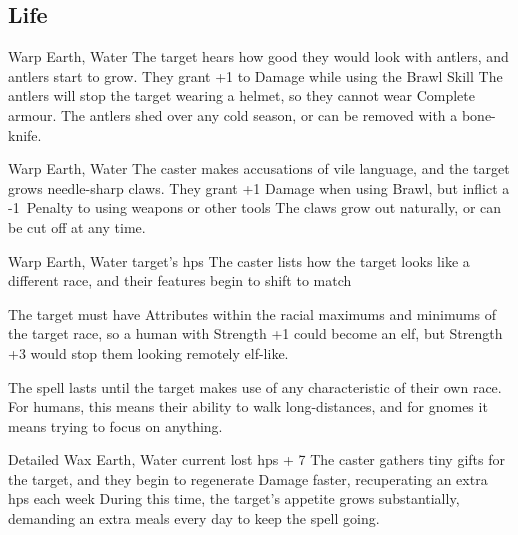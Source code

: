 \begin{multicols}{2}
{  



  \subsection{Life}
  \label{lifeSpells}


    {}%
    {Warp}%
    {Earth, Water}%
    {}%
    {The target hears how good they would look with antlers, and antlers start to grow.
    They grant +1 to Damage while using the Brawl Skill}%
    {
    The antlers will stop the target wearing a helmet, so they cannot wear Complete armour.
    The antlers shed over any cold season, or can be removed with a bone-knife.}

    {}%
    {Warp}%
    {Earth, Water}%
    {}%
    {The caster makes accusations of vile language, and the target grows needle-sharp claws.
    They grant +1 Damage when using Brawl, but inflict a -1~Penalty to using weapons or other tools}%
    {
    The claws grow out naturally, or can be cut off at any time.}

    {}%
    {Warp}%
    {Earth, Water}%
    {target's \glspl{hp}}%
    {The caster lists how the target looks like a different race, and their features begin to shift to match}%
    {The target must have Attributes within the racial maximums and minimums of the target race, so a human with Strength +1 could become an elf, but Strength +3 would stop them looking remotely elf-like.

    The spell lasts until the target makes use of any characteristic of their own race.
    For humans, this means their ability to walk long-distances, and for gnomes it means trying to focus on anything.}

    {Detailed}%
    {Wax}%
    {Earth, Water}%
    {current lost \glspl{hp} + 7}%
    {The caster gathers tiny gifts for the target, and they begin to regenerate Damage faster, recuperating an extra  \glspl{hp} each week}%
    {During this time, the target's appetite grows substantially, demanding an extra  meals every day to keep the spell going.}

}
\end{multicols}
